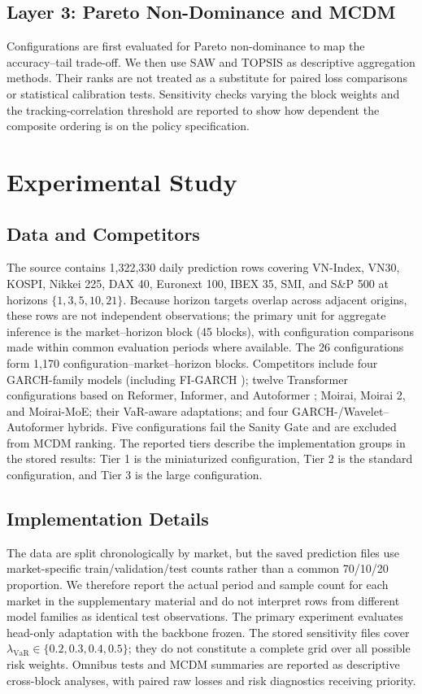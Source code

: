 \documentclass[runningheads]{llncs}
\begin{document}
\subsection{Layer 3: Pareto Non-Dominance and MCDM}
Configurations are first evaluated for Pareto non-dominance to map the accuracy--tail trade-off. We then use SAW \cite{ref14} and TOPSIS \cite{ref15,ref16} as descriptive aggregation methods. Their ranks are not treated as a substitute for paired loss comparisons or statistical calibration tests. Sensitivity checks varying the block weights and the tracking-correlation threshold are reported to show how dependent the composite ordering is on the policy specification.

\section{Experimental Study}

\subsection{Data and Competitors}
The source contains 1,322,330 daily prediction rows covering VN-Index, VN30, KOSPI, Nikkei 225, DAX 40, Euronext 100, IBEX 35, SMI, and S\&P 500 at horizons $\{1, 3, 5, 10, 21\}$. Because horizon targets overlap across adjacent origins, these rows are not independent observations; the primary unit for aggregate inference is the market--horizon block (45 blocks), with configuration comparisons made within common evaluation periods where available. The 26 configurations form 1,170 configuration--market--horizon blocks. Competitors include four GARCH-family models (including FI-GARCH \cite{ref3}); twelve Transformer configurations based on Reformer, Informer, and Autoformer \cite{ref4,ref5,ref6}; Moirai, Moirai 2, and Moirai-MoE; their VaR-aware adaptations; and four GARCH-/Wavelet--Autoformer hybrids. Five configurations fail the Sanity Gate and are excluded from MCDM ranking. The reported tiers describe the implementation groups in the stored results: Tier 1 is the miniaturized configuration, Tier 2 is the standard configuration, and Tier 3 is the large configuration.

\subsection{Implementation Details}
The data are split chronologically by market, but the saved prediction files use market-specific train/validation/test counts rather than a common 70/10/20 proportion. We therefore report the actual period and sample count for each market in the supplementary material and do not interpret rows from different model families as identical test observations. The primary experiment evaluates head-only adaptation with the backbone frozen. The stored sensitivity files cover $\lambda_{\text{VaR}}\in\{0.2,0.3,0.4,0.5\}$; they do not constitute a complete grid over all possible risk weights. Omnibus tests and MCDM summaries are reported as descriptive cross-block analyses, with paired raw losses and risk diagnostics receiving priority.
\end{document}
